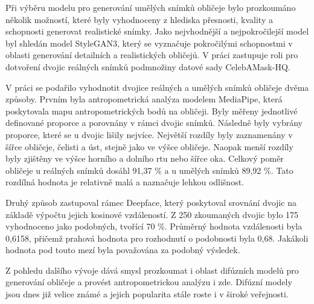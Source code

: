Při výběru modelu pro generování umělých snímků obličeje bylo prozkoumáno několik možností, které byly vyhodnoceny z hlediska přesnosti, kvality a schopnosti generovat realistické snímky. Jako nejvhodnější a nejpokročilejší model byl shledán model StyleGAN3, který se vyznačuje pokročilými schopnostmi v oblasti generování detailních a realistických obličejů. V práci zastupuje roli pro dotvoření dvojic reálných snímků podmnožiny datové sady CelebAMask-HQ.

V práci se podařilo vyhodnotit dvojice reálných a umělých snímků obličeje dvěma způsoby. Prvním byla antropometrická analýza modelem MediaPipe, která poskytovala mapu antropometrických bodů na obličeji. Byly měřeny jednotlivé definované proporce a porovnány v rámci dvojic snímků. Následně byly vybrány proporce, které se u dvojic lišily nejvíce. Největší rozdíly byly zaznamenány v šířce obličeje, čelisti a úst, stejně jako ve výšce obličeje. Naopak menší rozdíly byly zjištěny ve výšce horního a dolního rtu nebo šířce oka. Celkový poměr obličeje u reálných snímků dosáhl 91,37 \% a u umělých snímků 89,92 \%. Tato rozdílná hodnota je relativně malá a naznačuje lehkou odlišnost.

Druhý způsob zastupoval rámec Deepface, který poskytoval srovnání dvojic na základě výpočtu jejich kosinové vzdáleností. Z 250 zkoumaných dvojic bylo 175 vyhodnoceno jako podobných, tvořící 70 \%. Průměrný hodnota vzdálenosti byla 0,6158, přičemž prahová hodnota pro rozhodnutí o podobnosti byla 0,68. Jakákoli hodnota pod touto mezí byla považována za podobný výsledek.

Z pohledu dalšího vývoje dává smysl prozkoumat i oblast difúzních modelů pro generování obličeje a provést antropometrickou analýzu i zde. Difúzní modely jsou dnes již velice známé a jejich popularita stále roste i v široké veřejnosti.




%
